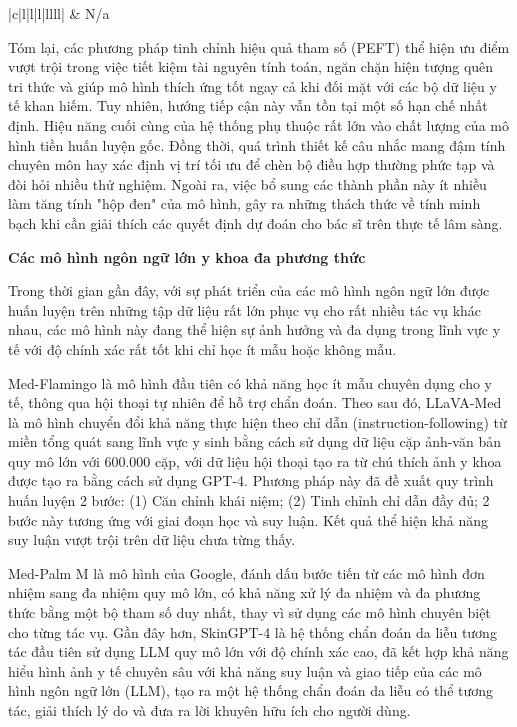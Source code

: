 \begin{refsection}
\begin{table}[htpb]
{\begin{tabular}{|c|l|l|l|llll|}
     &
    N/a \\ \hline
  \end{tabular}
  }
  \caption{Bảng tổng hợp chiến lược, mục tiêu và phương pháp học chuyển giao của các mô hình ngôn ngữ trực quan}
  \label{tab:VLMTransferlearningMethod}
  \end{table}

Tóm lại, các phương pháp tinh chỉnh hiệu quả tham số (PEFT) thể hiện ưu điểm vượt trội trong việc tiết kiệm tài nguyên tính toán, ngăn chặn hiện tượng quên tri thức và giúp mô hình thích ứng tốt ngay cả khi đối mặt với các bộ dữ liệu y tế khan hiếm. Tuy nhiên, hướng tiếp cận này vẫn tồn tại một số hạn chế nhất định. Hiệu năng cuối cùng của hệ thống phụ thuộc rất lớn vào chất lượng của mô hình tiền huấn luyện gốc. Đồng thời, quá trình thiết kế câu nhắc mang đậm tính chuyên môn hay xác định vị trí tối ưu để chèn bộ điều hợp thường phức tạp và đòi hỏi nhiều thử nghiệm. Ngoài ra, việc bổ sung các thành phần này ít nhiều làm tăng tính "hộp đen" của mô hình, gây ra những thách thức về tính minh bạch khi cần giải thích các quyết định dự đoán cho bác sĩ trên thực tế lâm sàng.

\textbf{Các mô hình ngôn ngữ lớn y khoa đa phương thức}

Trong thời gian gần đây, với sự phát triển của các mô hình ngôn ngữ lớn được huấn luyện trên những tập dữ liệu rất lớn phục vụ cho rất nhiều tác vụ khác nhau, các mô hình này đang thể hiện sự ảnh hưởng và đa dụng trong lĩnh vực y tế với độ chính xác rất tốt khi chỉ học ít mẫu hoặc không mẫu.

Med-Flamingo \cite{moor_2023_medflamingo} là mô hình đầu tiên có khả năng học ít mẫu chuyên dụng cho y tế, thông qua hội thoại tự nhiên để hỗ trợ chẩn đoán. Theo sau đó, LLaVA-Med \cite{li_2023_llavamed} là mô hình chuyển đổi khả năng thực hiện theo chỉ dẫn (instruction-following) từ miền tổng quát sang lĩnh vực y sinh bằng cách sử dụng dữ liệu cặp ảnh-văn bản quy mô lớn với 600.000 cặp, với dữ liệu hội thoại tạo ra từ chú thích ảnh y khoa được tạo ra bằng cách sử dụng GPT-4. Phương pháp này đã đề xuất quy trình huấn luyện 2 bước: (1) Căn chỉnh khái niệm; (2) Tinh chỉnh chỉ dẫn đầy đủ; 2 bước này tương ứng với giai đoạn học và suy luận. Kết quả thể hiện khả năng suy luận vượt trội trên dữ liệu chưa từng thấy.

Med-Palm M \cite{MED-PALM-M} là mô hình của Google, đánh dấu bước tiến từ các mô hình đơn nhiệm sang đa nhiệm quy mô lớn, có khả năng xử lý đa nhiệm và đa phương thức bằng một bộ tham số duy nhất, thay vì sử dụng các mô hình chuyên biệt cho từng tác vụ. Gần đây hơn, SkinGPT-4 \cite{SkinGPT-4} là hệ thống chẩn đoán da liễu tương tác đầu tiên sử dụng LLM quy mô lớn với độ chính xác cao, đã kết hợp khả năng hiểu hình ảnh y tế chuyên sâu với khả năng suy luận và giao tiếp của các mô hình ngôn ngữ lớn (LLM), tạo ra một hệ thống chẩn đoán da liễu có thể tương tác, giải thích lý do và đưa ra lời khuyên hữu ích cho người dùng.


\end{refsection}
